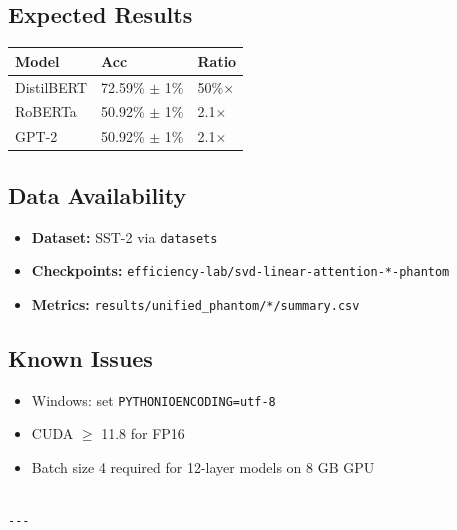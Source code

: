 \subsection{Expected Results}

\begin{table}[H]
\centering
\small
\begin{tabular}{lll}
\toprule
\textbf{Model} & \textbf{Acc} & \textbf{Ratio} \\
\midrule
DistilBERT & 72.59\% $\pm$ 1\% & 50\%$\times$ \\
RoBERTa & 50.92\% $\pm$ 1\% & 2.1$\times$ \\
GPT-2 & 50.92\% $\pm$ 1\% & 2.1$\times$ \\
\bottomrule
\end{tabular}
\end{table}

\subsection{Data Availability}

\begin{itemize}
\item \textbf{Dataset:} SST-2 via \texttt{datasets}
\item \textbf{Checkpoints:} \texttt{efficiency-lab/svd-linear-attention-*-phantom}
\item \textbf{Metrics:} \texttt{results/unified\_phantom/*/summary.csv}

\end{itemize}
\subsection{Known Issues}

\begin{itemize}
\item Windows: set \texttt{PYTHONIOENCODING=utf-8}
\item CUDA $\ge$ 11.8 for FP16
\item Batch size 4 required for 12-layer models on 8 GB GPU
\end{itemize}
\begin{lstlisting}

---
\end{lstlisting}